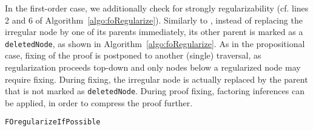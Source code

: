In the first-order case, we additionally check for strongly regularizability (cf. lines 2 and 6 of Algorithm~\ref{algo:foRegularize}).
Similarly to {\RPI}, instead of replacing the irregular node by one of its parents immediately, 
its other parent is marked as a \texttt{deletedNode}, as shown in Algorithm~\ref{algo:foRegularize}.
As in the propositional case, fixing of the proof is postponed to another (single) traversal, as regularization proceeds top-down and only nodes below a regularized node may require fixing.
During fixing, the irregular node is actually replaced by the parent that is not marked as \texttt{deletedNode}. During proof fixing, factoring inferences can be applied, in order to compress the proof further.


\begin{algorithm}[bt]
\begin{footnotesize}



\BlankLine
\caption{\label{algo:foRegularize} \texttt{FOregularizeIfPossible}}
\end{footnotesize}
\end{algorithm}


